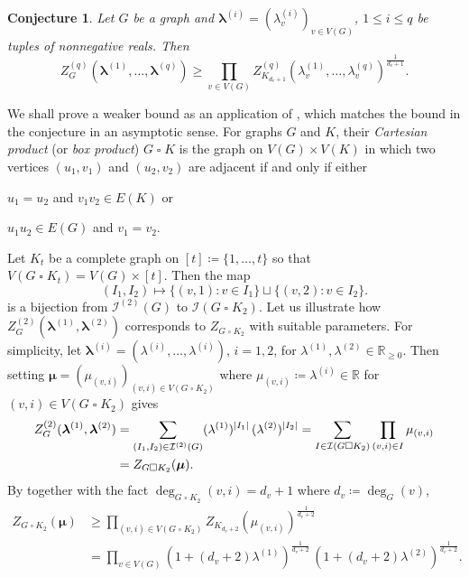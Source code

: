 \documentclass{article}
\numberwithin{equation}{section}
\theoremstyle{plain}
\newtheorem{conjecture}[theorem]{Conjecture}
\theoremstyle{definition}
\theoremstyle{remark} %
\DeclarePairedDelimiter{\abs}{\lvert}{\rvert}
\newcommand{\defeq}{\coloneqq}
\newcommand{\RR}{\mathbb{R}}
\newcommand{\calI}{\mathcal{I}}
\newcommand{\blambda}{\bm{\lambda}}
\newcommand{\cart}{\mathbin{\square}} %
\begin{document}
\begin{conjecture}\label{conj:semiproper-colouring-poly-multiaff-lower-bd}
    Let \(G\) be a graph and \(\blambda^{(i)} = (\lambda^{(i)}_v)_{v\in V(G)}\), \(1\le i\le q\) be tuples of nonnegative reals. Then
    \[
        Z^{(q)}_G(\blambda^{(1)}, \dots, \blambda^{(q)})
        \ge \prod_{v\in V(G)} Z^{(q)}_{K_{d_v+1}} (\lambda^{(1)}_v,\dots,\lambda^{(q)}_v) ^{\frac{1}{d_v+1}}.
    \]
\end{conjecture}

We shall prove a weaker bound as an application of , which matches the bound in the conjecture in an asymptotic sense.
For graphs \(G\) and \(K\), their \emph{Cartesian product} (or \emph{box product}) \(G\cart K\) is the graph on \(V(G)\times V(K)\) in which two vertices \((u_1,v_1)\) and \((u_2,v_2)\) are adjacent if and only if either
\begin{enumerate*}
    \item \(u_1=u_2\) and \(v_1v_2\in E(K)\) or
    \item \(u_1u_2\in E(G)\) and \(v_1=v_2\).
\end{enumerate*}
Let $K_t$ be a complete graph on \([t]\defeq \{1,\dots,t\}\) so that \(V(G\cart K_t) = V(G)\times [t]\).
Then the map
\[
    (I_1,I_2)\mapsto \{(v,1) : v\in I_1\} \sqcup \{(v,2) : v\in I_2\}.
\]
is a bijection from \(\calI^{(2)}(G)\) to \(\calI(G\cart K_2)\).
Let us illustrate how $Z^{(2)}_G(\blambda^{(1)}, \blambda^{(2)})$ corresponds to $Z_{G\cart K_2}$ with suitable parameters. 
For simplicity, let $\blambda^{(i)}=(\lambda^{(i)},\dots,\lambda^{(i)})$, $i=1,2$,  for \(\lambda^{(1)},\lambda^{(2)}\in\RR_{\ge0}\).
Then setting \(\bm{\mu}=(\mu_{(v,i)})_{(v,i)\in V(G\cart K_2)}\) where \(\mu_{(v,i)}\defeq \lambda^{(i)}\in \RR\) for \((v,i)\in V(G\cart K_2)\) gives
\begin{align*}
    Z^{(2)}_G(\blambda^{(1)}, \blambda^{(2)})
    &= \sum_{(I_1,I_2)\in \calI^{(2)}(G)} (\lambda^{(1)})^{\abs{I_1}} \, (\lambda^{(2)})^{\abs{I_2}}
    = \sum_{I\in \calI(G\cart K_2)} \prod_{(v,i)\in I} \mu_{(v,i)}
    \\&= Z_{G\cart K_2} (\bm{\mu}).
\end{align*}
By  together with the fact \(\deg_{G\cart K_2}(v,i)=d_v+1\) where \(d_v\defeq\deg_G(v)\),
\begin{align*}
    Z_{G\cart K_2} (\bm{\mu})
    &\ge \prod_{(v,i)\in V(G\cart K_2)} Z_{K_{d_v+2}}(\mu_{(v,i)})^{\frac{1}{d_v+2}}
    \\&= \prod_{v\in V(G)} (1+(d_v+2)\lambda^{(1)})^{\frac{1}{d_v+2}} \, (1+(d_v+2)\lambda^{(2)})^{\frac{1}{d_v+2}}.
\end{align*}
\end{document}
